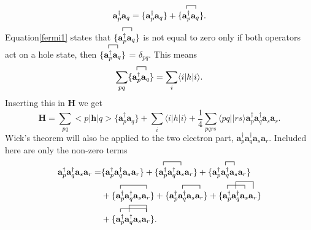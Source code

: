 \documentclass[a4paper,norsk,11pt,twoside]{report}
\begin{document}
\begin{equation}
\textbf{a}^{\dag}_p \textbf{a}_q = \{\textbf{a}^{\dag}_p \textbf{a}_q \} + \{\contraction{}{\textbf{a}^{\dag}_p}{}{\textbf{a}_q}
 \textbf{a}^{\dag}_p \textbf{a}_q 
\} . 
\end{equation}
Equation\eqref{fermi1} states that
$\{\contraction{}{\textbf{a}^{\dag}_p}{}{\textbf{a}_q}
\textbf{a}^{\dag}_p \textbf{a}_q \}$ is not equal to zero only if both
operators act on a hole state, then
$\{\contraction{}{\textbf{a}^{\dag}_p}{}{\textbf{a}_q}
\textbf{a}^{\dag}_p \textbf{a}_q \}$ = $\delta_{pq}$. This means
\begin{equation}
\sum_{pq}
\{\contraction{}{\textbf{a}^{\dag}_p}{}{\textbf{a}_q}
\textbf{a}^{\dag}_p \textbf{a}_q \} = \sum_i \langle i|h|i \rangle .
\end{equation}
Inserting this in $\textbf{H}$ we get
\begin{equation}
\textbf{H} = \sum_{pq} <p|\textbf{h}|q> 
\{\textbf{a}^{\dag}_p \textbf{a}_q \}
+ \sum_i \langle i|h|i \rangle
 + 
\frac{1}{4} \sum_{pqrs} \langle pq||rs \rangle \textbf{a}^{\dag}_p \textbf{a}^{\dag}_q \textbf{a}_s \textbf{a}_r . \label{temp_h}
\end{equation}
Wick's theorem will also be applied to the two electron part,
$\textbf{a}^{\dag}_p \textbf{a}^{\dag}_q \textbf{a}_s
\textbf{a}_r$. Included here are only the non-zero terms
\begin{align}
\textbf{a}^{\dag}_p \textbf{a}^{\dag}_q \textbf{a}_s \textbf{a}_r = & \{\textbf{a}^{\dag}_p \textbf{a}^{\dag}_q \textbf{a}_s \textbf{a}_r\} 
+ \{
\contraction{}{\textbf{a}^{\dag}_p}{\textbf{a}^{\dag}_q}{\textbf{a}_s}
\textbf{a}^{\dag}_p \textbf{a}^{\dag}_q \textbf{a}_s 
\textbf{a}_r
\}
+ \{
\textbf{a}^{\dag}_p
\contraction{}{\textbf{a}^{\dag}_q}{}{\textbf{a}_s}
\textbf{a}^{\dag}_q \textbf{a}_s 
\textbf{a}_r
\} \nonumber \\ &
+ \{
\contraction{}{\textbf{a}^{\dag}_p}{\textbf{a}^{\dag}_q \textbf{a}_s}{\textbf{a}_r}
\textbf{a}^{\dag}_p \textbf{a}^{\dag}_q \textbf{a}_s 
\textbf{a}_r
\}
+ \{\textbf{a}^{\dag}_p
\contraction{}{\textbf{a}^{\dag}_q}{\textbf{a}_s}{\textbf{a}_r}
\textbf{a}^{\dag}_q \textbf{a}_s \textbf{a}_r
\}
+ \{
\contraction{}{\textbf{a}^{\dag}_p}{\textbf{a}^{\dag}_q}{\textbf{a}_s}
\contraction[2ex]{\textbf{a}^{\dag}_p}{\textbf{a}^{\dag}_q}{\textbf{a}_s}{\textbf{a}_r}
\textbf{a}^{\dag}_p \textbf{a}^{\dag}_q \textbf{a}_s 
\textbf{a}_r
\} \nonumber \\ &
+ \{
\contraction[2ex]{\textbf{a}^{\dag}_p}{\textbf{a}^{\dag}_q}{\textbf{a}_s}{\textbf{a}_r}
\contraction{}{\textbf{a}^{\dag}_p}{\textbf{a}^{\dag}_q \textbf{a}_s}{\textbf{a}_r}
\textbf{a}^{\dag}_p \textbf{a}^{\dag}_q \textbf{a}_s 
\textbf{a}_r
\} . \nonumber
\end{align}
\end{document}

